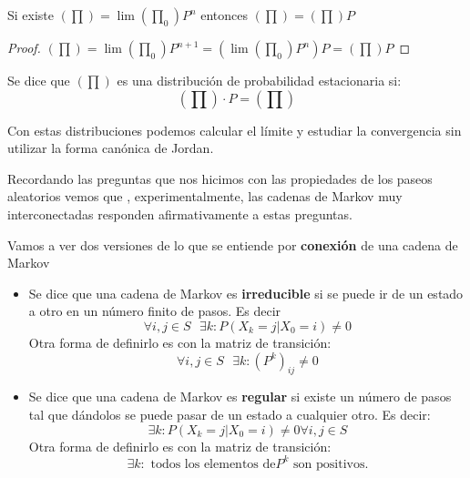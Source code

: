 \obs Si existe $(\prod) = \lim (\prod_0) P^n$ entonces $(\prod) = (\prod) P$
\begin{proof}
	$(\prod) = \lim(\prod_0) P^{n+1} = (\lim (\prod_0)P^n)P = (\prod) P$
\end{proof}

\begin{defn}
	Se dice que $(\prod)$ es una distribución de probabilidad estacionaria si:
	$$(\prod)\cdot P = (\prod)$$	
\end{defn}

\obs Con estas distribuciones podemos calcular el límite y estudiar la convergencia sin utilizar la forma canónica de Jordan.


Recordando las preguntas que nos hicimos con las propiedades de los paseos aleatorios vemos que , experimentalmente, las cadenas de Markov muy interconectadas responden afirmativamente a estas preguntas.

Vamos a ver dos versiones de lo que se entiende por \textbf{conexión} de una cadena de Markov
\begin{itemize}
	\item \begin{defn}[Irreducible]
		Se dice que una cadena de Markov es \textbf{irreducible} si se puede ir de un estado a otro en un número finito de pasos. Es decir
		$$\forall i,j \in S\text{    }\exists k : P(X_k = j| X_0 = i) \neq 0$$
		Otra forma de definirlo es con la matriz de transición:
		$$\forall i,j \in S \text{    }\exists k: (P^k)_{ij} \neq 0$$
	\end{defn}
	\item \begin{defn}[Regular]
		Se dice que una cadena de Markov es \textbf{regular} si existe un número de pasos tal que dándolos se puede pasar de un estado a cualquier otro. Es decir:
		$$ \exists k : P(X_k = j| X_0 = i) \neq 0  \forall i,j \in S $$
		Otra forma de definirlo es con la matriz de transición:
		$$\exists k : \text{ todos los elementos de} P^k \text{ son positivos.}$$
	\end{defn}
\end{itemize}





